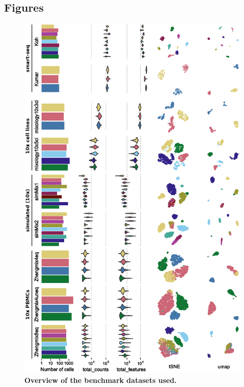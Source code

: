 \documentclass{bmcart}
\begin{document}
\begin{backmatter}



\section*{Figures}


\showfigstrue

\begin{figure}
    \centering
    \ifshowfigs
    \includegraphics[width=\textwidth,keepaspectratio]{dataset_description}
    \fi
    \caption{\textbf{Overview of the benchmark datasets used.}}
    \label{fig:figure1}
\end{figure}


\end{backmatter}
\end{document}
